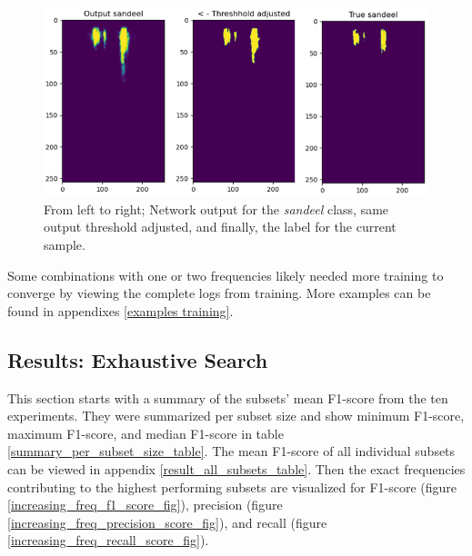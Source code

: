         \begin{figure}[H]
            \centering
            \includegraphics[scale=0.7]{figures/SANDEEL_WITH_LABEL.png}
            \caption[Example output, threshold and label]{From left to right; Network output for the \textit{sandeel} class, same output threshold adjusted, and finally, the label for the current sample.}
          	\medskip 
            \label{sandeel_threshold_label}
        \end{figure}
    
    
     Some combinations with one or two frequencies likely needed more training to converge by viewing the complete logs from training. More examples can be found in appendixes \ref{examples training}.
    

\subsection{Results: Exhaustive Search}
    This section starts with a summary of the subsets' mean F1-score from the ten experiments. They were summarized per subset size and show minimum F1-score, maximum F1-score, and median F1-score in table \ref{summary_per_subset_size_table}. The mean F1-score of all individual subsets can be viewed in appendix \ref{result_all_subsets_table}. Then the exact frequencies contributing to the highest performing subsets are visualized for F1-score (figure \ref{increasing_freq_f1_score_fig}), precision (figure \ref{increasing_freq_precision_score_fig}), and recall (figure \ref{increasing_freq_recall_score_fig}).


